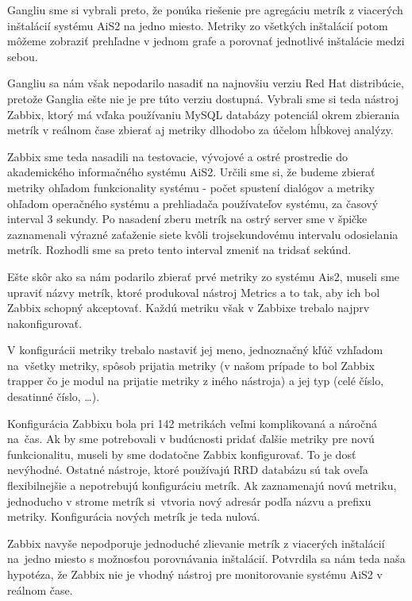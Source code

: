 \documentclass[a4paper, upjsfrontpage, disablespecwarning, thesismargins, thesislinespacing]{rnthesis}
\begin{document}
Gangliu sme si vybrali preto, že ponúka riešenie pre agregáciu metrík z viacerých inštalácií systému AiS2 na jedno miesto.
Metriky zo všetkých inštalácií potom môžeme zobraziť prehľadne v jednom grafe a porovnať jednotlivé inštalácie medzi sebou.

Gangliu sa nám však nepodarilo nasadiť na najnovšiu verziu Red Hat distribúcie, pretože Ganglia ešte nie je pre túto verziu dostupná.
Vybrali sme si teda nástroj Zab\-bix, ktorý má vďaka používaniu MySQL databázy potenciál okrem zbierania metrík v reálnom čase zbierať aj metriky dlhodobo za účelom hĺbkovej analýzy. 

Zabbix sme teda nasadili na testovacie, vývojové a ostré prostredie do akademického informačného systému AiS2.
Určili sme si, že budeme zbierať metriky ohľadom funkcionality systému - počet spustení dialógov a metriky ohľadom operačného systému a prehliadača používateľov systému, za časový interval 3 sekundy.
Po nasadení zberu metrík na ostrý server sme v špičke zaznamenali výrazné zaťaženie siete kvôli trojsekundovému intervalu odosielania metrík.
Rozhodli sme sa preto tento interval zmeniť na tridsať sekúnd.

Ešte skôr ako sa nám podarilo zbierať prvé metriky zo systému Ais2, 
	museli sme upraviť názvy metrík, ktoré produkoval nástroj Metrics a to tak, aby ich bol Zabbix schopný akceptovať.
Každú metriku však v Zabbixe trebalo najprv nakonfigurovať.

V konfigurácii metriky trebalo nastaviť jej meno, 
	jednoznačný kľúč vzhľadom na~všetky metriky, 
	spôsob prijatia metriky (v našom prípade to bol Zabbix trapper čo je modul na prijatie metriky z iného nástroja) a jej typ (celé číslo, desatinné číslo, \ldots).

Konfigurácia Zabbixu bola pri 142 metrikách veľmi komplikovaná a náročná na~čas.
Ak by sme potrebovali v budúcnosti pridať ďalšie metriky pre novú funkcionalitu, museli by sme dodatočne Zabbix konfigurovať.
To je dosť nevýhodné.
Ostatné nástroje, ktoré používajú RRD databázu sú tak oveľa flexibilnejšie a nepotrebujú konfiguráciu metrík.
Ak zaznamenajú novú metriku, jednoducho v strome metrík si~vtvoria nový adresár podľa názvu a prefixu metriky.
Konfigurácia nových metrík je teda nulová.

Zabbix navyše nepodporuje jednoduché zlievanie metrík z viacerých inštalácií na~jedno miesto s možnosťou porovnávania inštalácií.
Potvrdila sa nám teda naša hypotéza, že Zabbix nie je vhodný nástroj pre monitorovanie systému AiS2 v reálnom čase.
\end{document}
